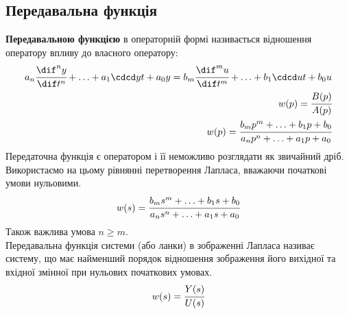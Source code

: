 \subsection{Передавальна функція}
{\bf Передавальною функцією} в операторній формі називається відношення оператору впливу до власного оператору:
\begin{eqnarray}
a_n\cdncdn yt +\ldots+a_1\cdcd yt +a_0y = b_m\cdmcdm ut + \ldots + b_1 \cdcd ut + b_0 u \\
w(p)=\cfrac{B(p)}{A(p)}\\
w(p) = \cfrac{b_mp^m + \ldots + b_1p+b_0}{a_np^n +\ldots +a_1p+a_0}
\end{eqnarray}
Передаточна функція є оператором і її неможливо розглядати як звичайний дріб. Використаємо на цьому рівнянні %
перетворення Лапласа, вважаючи початкові умови нульовими. \\
\begin{eqnarray}
w(s) = \cfrac{b_ms^m + \ldots + b_1s+b_0}{a_ns^n +\ldots +a_1s+a_0}
\end{eqnarray}
Також важлива умова $n\geq m$.\\
Передавальна функція системи (або ланки) в зображенні Лапласа називає систему, що має найменший порядок відношення зображення його вихідної та вхідної змінної при нульових початкових умовах.
\begin{equation}
w(s)=\cfrac{Y(s)}{U(s)}
\end{equation}